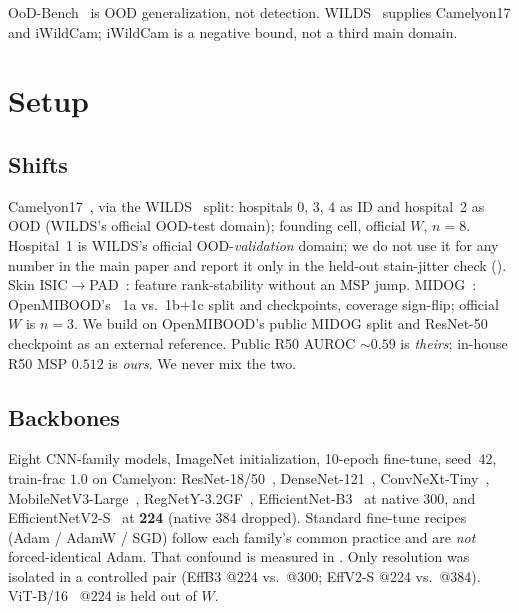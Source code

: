 \documentclass[anon]{midl}
\begin{document}
OoD-Bench~\cite{ye2022oodbench} is OOD generalization, not detection.
WILDS~\cite{koh2021wilds} supplies Camelyon17 and iWildCam; iWildCam is a negative bound, not a third main domain.

\section{Setup}

\subsection{Shifts}

Camelyon17~\cite{bandi2019camelyon17}, via the WILDS~\cite{koh2021wilds} split: hospitals 0, 3, 4 as ID and hospital~2 as OOD (WILDS's official OOD-test domain); founding cell, official $W$, $n{=}8$.
Hospital~1 is WILDS's official OOD-\emph{validation} domain; we do not use it for any number in the main paper and report it only in the held-out stain-jitter check ().
Skin ISIC$\to$PAD~\cite{codella2019isic2018,pacheco2020pad}: feature rank-stability without an MSP jump.
MIDOG~\cite{aubreville2023midog}: OpenMIBOOD's~\cite{openmibood2025} 1a vs.\ 1b{+}1c split and checkpoints, coverage sign-flip; official $W$ is $n{=}3$.
We build on OpenMIBOOD's public MIDOG split and ResNet-50 checkpoint as an external reference.
Public R50 AUROC ${\sim}0.59$ is \emph{theirs}; in-house R50 MSP $0.512$ is \emph{ours}. We never mix the two.

\subsection{Backbones}

Eight CNN-family models, ImageNet initialization, 10-epoch fine-tune, seed~42, train-frac $1.0$ on Camelyon: ResNet-18/50~\cite{he2016resnet}, DenseNet-121~\cite{huang2017densenet}, ConvNeXt-Tiny~\cite{liu2022convnext}, MobileNetV3-Large~\cite{howard2019mobilenetv3}, RegNetY-3.2GF~\cite{radosavovic2020regnet}, EfficientNet-B3~\cite{tan2019efficientnet} at native 300, and EfficientNetV2-S~\cite{tan2021efficientnetv2} at \textbf{224} (native 384 dropped).
Standard fine-tune recipes (Adam / AdamW / SGD) follow each family's common practice and are \emph{not} forced-identical Adam.
That confound is measured in .
Only resolution was isolated in a controlled pair (EffB3 @224 vs.\ @300; EffV2-S @224 vs.\ @384).
ViT-B/16~\cite{dosovitskiy2021vit} @224 is held out of $W$.
\end{document}
